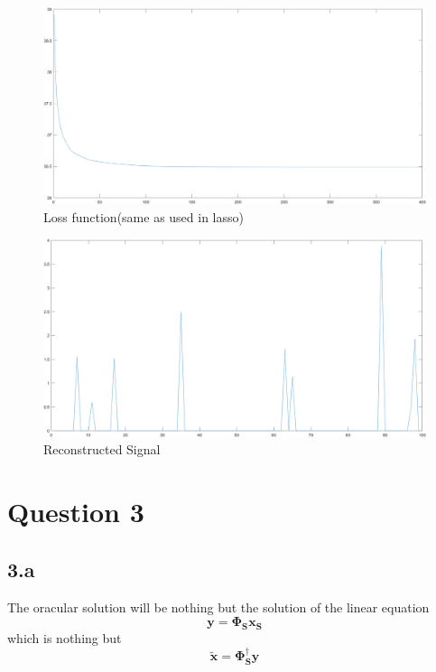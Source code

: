 \documentclass[12pt]{article}
\begin{document}
\begin{figure}[H]
  \centering
  \includegraphics[scale=0.35]{lossFn.png}  %
  \caption{Loss function(same as used in lasso)}
  \label{fig:7}
\end{figure}
\begin{figure}[H]
  \centering
  \includegraphics[scale=0.35]{rec_signal.png}  %
  \caption{Reconstructed Signal}
  \label{fig:8}
\end{figure}

\section*{Question 3}
\subsection*{3.a}
The oracular solution will be nothing but the solution of the linear equation
$$\boldsymbol{y} = \boldsymbol{\Phi_S} \boldsymbol{x_S}$$
which is nothing but
$$\boldsymbol{\tilde{x}} = \boldsymbol{\Phi_S^\dagger}\boldsymbol{y}$$
\end{document}
